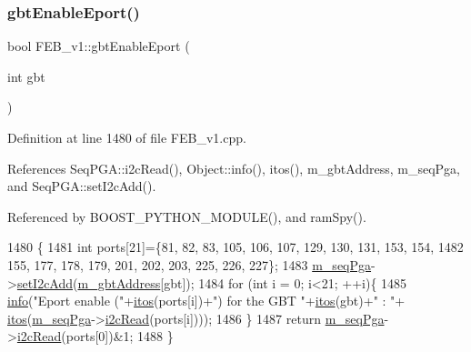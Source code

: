 \subsubsection{\texorpdfstring{gbt\+Enable\+Eport()}{gbtEnableEport()}}
{\footnotesize\ttfamily bool F\+E\+B\+\_\+v1\+::gbt\+Enable\+Eport (\begin{DoxyParamCaption}\item[{int}]{gbt }\end{DoxyParamCaption})}



Definition at line 1480 of file F\+E\+B\+\_\+v1.\+cpp.



References Seq\+P\+G\+A\+::i2c\+Read(), Object\+::info(), itos(), m\+\_\+gbt\+Address, m\+\_\+seq\+Pga, and Seq\+P\+G\+A\+::set\+I2c\+Add().



Referenced by B\+O\+O\+S\+T\+\_\+\+P\+Y\+T\+H\+O\+N\+\_\+\+M\+O\+D\+U\+L\+E(), and ram\+Spy().


\begin{DoxyCode}
1480                                     \{
1481   \textcolor{keywordtype}{int} ports[21]=\{81, 82, 83, 105, 106, 107, 129, 130, 131, 153, 154,
1482          155, 177, 178, 179, 201, 202, 203, 225, 226, 227\};
1483   \hyperlink{classFEB__v1_a6c7804ac86796f233a8393043adf2e77}{m\_seqPga}->\hyperlink{classSeqPGA_a4ef334e4d2cb417b49033dce951728cd}{setI2cAdd}(\hyperlink{classFEB__v1_ac625855df976f16694178f1a4c0eef1e}{m\_gbtAddress}[gbt]);
1484   \textcolor{keywordflow}{for} (\textcolor{keywordtype}{int} i = 0; i<21; ++i)\{
1485     \hyperlink{classObject_a644fd329ea4cb85f54fa6846484b84a8}{info}(\textcolor{stringliteral}{"Eport enable ("}+\hyperlink{Tools_8h_af330027dbdafb9a30768b3613c553e60}{itos}(ports[i])+\textcolor{stringliteral}{") for the GBT "}+\hyperlink{Tools_8h_af330027dbdafb9a30768b3613c553e60}{itos}(gbt)+\textcolor{stringliteral}{" : "}+
      \hyperlink{Tools_8h_af330027dbdafb9a30768b3613c553e60}{itos}(\hyperlink{classFEB__v1_a6c7804ac86796f233a8393043adf2e77}{m\_seqPga}->\hyperlink{classSeqPGA_a7cd344df2be99f3a02b487f80e87b27e}{i2cRead}(ports[i])));
1486   \}
1487   \textcolor{keywordflow}{return} \hyperlink{classFEB__v1_a6c7804ac86796f233a8393043adf2e77}{m\_seqPga}->\hyperlink{classSeqPGA_a7cd344df2be99f3a02b487f80e87b27e}{i2cRead}(ports[0])&1;
1488 \}
\end{DoxyCode}
\mbox{\label{classFEB__v1_aab7166214ef0f99f4835ce9a7416e052}} 
